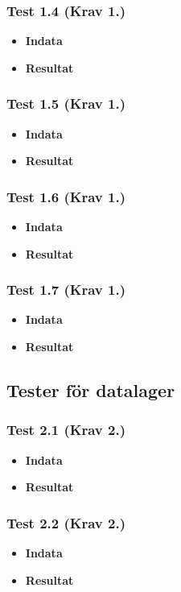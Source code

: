 \documentclass{TDP003mall}
\begin{document}
\subsubsection*{Test 1.4 (Krav 1.)}
\begin{itemize}
\item[]\textbf{Indata} 
\item[]\textbf{Resultat} 
\end{itemize}
\subsubsection*{Test 1.5 (Krav 1.)}
\begin{itemize}
\item[]\textbf{Indata} 
\item[]\textbf{Resultat} 
\end{itemize}
\subsubsection*{Test 1.6 (Krav 1.)}
\begin{itemize}
\item[]\textbf{Indata} 
\item[]\textbf{Resultat} 
\end{itemize}
\subsubsection*{Test 1.7 (Krav 1.)}
\begin{itemize}
\item[]\textbf{Indata} 
\item[]\textbf{Resultat} 
\end{itemize}

\subsection{Tester för datalager}
\subsubsection*{Test 2.1 (Krav 2.)}
\begin{itemize}
\item[]\textbf{Indata} 
\item[]\textbf{Resultat} 
\end{itemize}
\subsubsection*{Test 2.2 (Krav 2.)}
\begin{itemize}
\item[]\textbf{Indata} 
\item[]\textbf{Resultat} 
\end{itemize}
\end{document}
